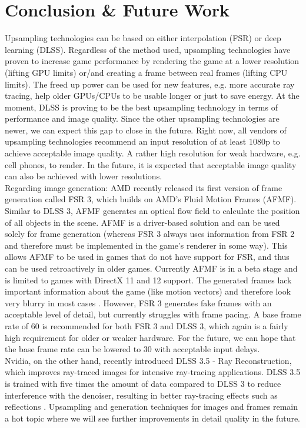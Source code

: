 \documentclass[letterpaper, 10 pt, conference]{ieeeconf}  %
\begin{document}
\section{Conclusion \& Future Work}
\label{Sec:ConcFuture}

Upsampling technologies can be based on either interpolation (FSR) or deep learning (DLSS).
Regardless of the method used, upsampling technologies have proven to increase game performance by rendering the game at a lower resolution (lifting GPU limits) or/and creating a frame between real frames (lifting CPU limits).
The freed up power can be used for new features, e.g. more accurate ray tracing, help older GPUs/CPUs to be usable longer or just to save energy.
At the moment, DLSS is proving to be the best upsampling technology in terms of performance and image quality.
Since the other upsampling technologies are newer, we can expect this gap to close in the future.
Right now, all vendors of upsampling technologies recommend an input resolution of at least 1080p to achieve acceptable image quality.
A rather high resolution for weak hardware, e.g. cell phones, to render.
In the future, it is expected that acceptable image quality can also be achieved with lower resolutions.\\
Regarding image generation:
AMD recently released its first version of frame generation called FSR 3, which builds on AMD's Fluid Motion Frames (AFMF).
Similar to DLSS 3, AFMF generates an optical flow field to calculate the position of all objects in the scene.
AFMF is a driver-based solution and can be used solely for frame generation (whereas FSR 3 always uses information from FSR 2 and therefore must be implemented in the game's renderer in some way).
This allows AFMF to be used in games that do not have support for FSR, and thus can be used retroactively in older games.
Currently AFMF is in a beta stage and is limited to games with DirectX 11 and 12 support.
The generated frames lack important information about the game (like motion vectors) and therefore look very blurry in most cases \cite{afmf}.
However, FSR 3 generates fake frames with an acceptable level of detail, but currently struggles with frame pacing.
A base frame rate of 60 is recommended for both FSR 3 and DLSS 3, which again is a fairly high requirement for older or weaker hardware.
For the future, we can hope that the base frame rate can be lowered to 30 with acceptable input delays.\\ 
Nvidia, on the other hand, recently introduced DLSS 3.5 - Ray Reconstruction, which improves ray-traced images for intensive ray-tracing applications.
DLSS 3.5 is trained with five times the amount of data compared to DLSS 3 to reduce interference with the denoiser, resulting in better ray-tracing effects such as reflections \cite{dlss_3.5}. 
Upsampling and generation techniques for images and frames remain a hot topic where we will see further improvements in detail quality in the future.
\end{document}
